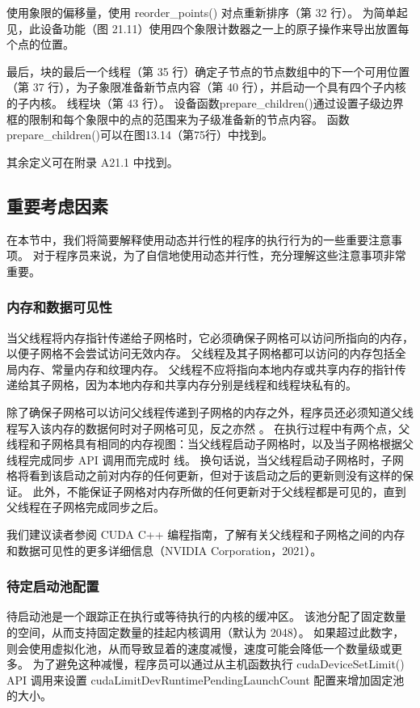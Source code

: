 使用象限的偏移量，使用 reorder\_points() 对点重新排序（第 32 行）。 为简单起见，此设备功能（图 21.11）使用四个象限计数器之一上的原子操作来导出放置每个点的位置。

最后，块的最后一个线程（第 35 行）确定子节点的节点数组中的下一个可用位置（第 37 行），为子象限准备新节点内容（第 40 行），并启动一个具有四个子内核的子内核。 线程块（第 43 行）。 设备函数prepare\_children()通过设置子级边界框的限制和每个象限中的点的范围来为子级准备新的节点内容。 函数prepare\_children()可以在图13.14（第75行）中找到。

其余定义可在附录 A21.1 中找到。

\subsection{重要考虑因素}
在本节中，我们将简要解释使用动态并行性的程序的执行行为的一些重要注意事项。 对于程序员来说，为了自信地使用动态并行性，充分理解这些注意事项非常重要。

\subsubsection{内存和数据可见性}
当父线程将内存指针传递给子网格时，它必须确保子网格可以访问所指向的内存，以便子网格不会尝试访问无效内存。 父线程及其子网格都可以访问的内存包括全局内存、常量内存和纹理内存。 父线程不应将指向本地内存或共享内存的指针传递给其子网格，因为本地内存和共享内存分别是线程和线程块私有的。

除了确保子网格可以访问父线程传递到子网格的内存之外，程序员还必须知道父线程写入该内存的数据何时对子网格可见，反之亦然 。 在执行过程中有两个点，父线程和子网格具有相同的内存视图：当父线程启动子网格时，以及当子网格根据父线程完成同步 API 调用而完成时 线。 换句话说，当父线程启动子网格时，子网格将看到该启动之前对内存的任何更新，但对于该启动之后的更新则没有这样的保证。 此外，不能保证子网格对内存所做的任何更新对于父线程都是可见的，直到父线程在子网格完成同步之后。

我们建议读者参阅 CUDA C++ 编程指南，了解有关父线程和子网格之间的内存和数据可见性的更多详细信息（NVIDIA Corporation，2021）。

\subsubsection{待定启动池配置}
待启动池是一个跟踪正在执行或等待执行的内核的缓冲区。 该池分配了固定数量的空间，从而支持固定数量的挂起内核调用（默认为 2048）。 如果超过此数字，则会使用虚拟化池，从而导致显着的速度减慢，速度可能会降低一个数量级或更多。 为了避免这种减慢，程序员可以通过从主机函数执行 cudaDeviceSetLimit() API 调用来设置 cudaLimitDevRuntimePendingLaunchCount 配置来增加固定池的大小。

